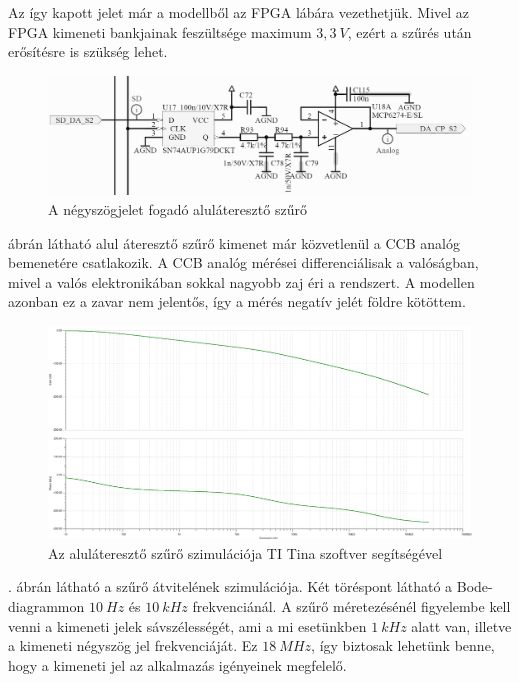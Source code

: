 Az így kapott jelet már a modellből az FPGA lábára vezethetjük. Mivel az FPGA kimeneti bankjainak feszültsége maximum $3,3\ V$, ezért a szűrés után erősítésre is szükség lehet.

\begin{figure}[!h]
	\centering
	\includegraphics[width = \textwidth]{figures/lowpassfilter.png}
	\caption{A négyszögjelet fogadó aluláteresztő szűrő} 
	\label{fig:lowpass}
\end{figure}

 ábrán látható alul áteresztő szűrő kimenet már közvetlenül a CCB analóg bemenetére csatlakozik. A CCB analóg mérései differenciálisak a valóságban, mivel a valós elektronikában sokkal nagyobb zaj éri a rendszert. A modellen azonban ez a zavar nem jelentős, így a mérés negatív jelét földre kötöttem.

\begin{figure}[!h]
	\centering
	\includegraphics[width = \textwidth]{figures/sigma_delta_sim.png}
	\caption{Az aluláteresztő szűrő szimulációja TI Tina szoftver segítségével} 
	\label{fig:lowpass_sim}
\end{figure}

. ábrán látható a szűrő átvitelének szimulációja. Két töréspont látható a Bode-diagrammon $10\ Hz$ és $10\ kHz$ frekvenciánál. A szűrő méretezésénél figyelembe kell venni a kimeneti jelek sávszélességét, ami a mi esetünkben $1\ kHz$ alatt van, illetve a kimeneti négyszög jel frekvenciáját. Ez $18\ MHz$, így biztosak lehetünk benne, hogy a kimeneti jel az alkalmazás igényeinek megfelelő.


